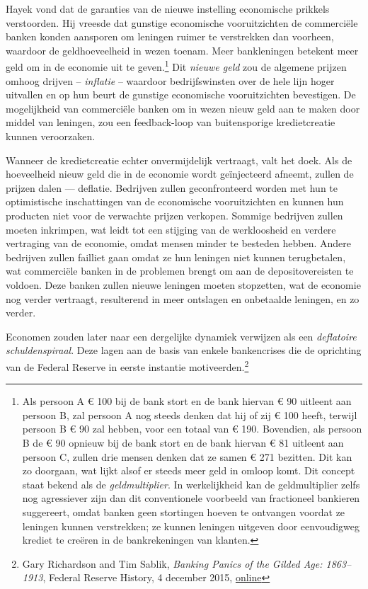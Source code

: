\documentclass[
  a5paper,
  smalldemyvopaper,11pt,twoside,onecolumn,openright,extrafontsizes,
hidelinks]{memoir}
\begin{document}
Hayek vond dat de garanties van de nieuwe instelling economische
prikkels verstoorden. Hij vreesde dat gunstige economische
vooruitzichten de commerciële banken konden aansporen om leningen ruimer
te verstrekken dan voorheen, waardoor de geldhoeveelheid in wezen
toenam. Meer bankleningen betekent meer geld om in de economie uit te
geven.\footnote{Als persoon A € 100 bij de bank stort en de bank hiervan
  € 90 uitleent aan persoon B, zal persoon A nog steeds denken dat hij
  of zij € 100 heeft, terwijl persoon B € 90 zal hebben, voor een totaal
  van € 190. Bovendien, als persoon B de € 90 opnieuw bij de bank stort
  en de bank hiervan € 81 uitleent aan persoon C, zullen drie mensen
  denken dat ze samen € 271 bezitten. Dit kan zo doorgaan, wat lijkt
  alsof er steeds meer geld in omloop komt. Dit concept staat bekend als
  de \emph{geldmultiplier}. In werkelijkheid kan de geldmultiplier zelfs
  nog agressiever zijn dan dit conventionele voorbeeld van fractioneel
  bankieren suggereert, omdat banken geen stortingen hoeven te ontvangen
  voordat ze leningen kunnen verstrekken; ze kunnen leningen uitgeven
  door eenvoudigweg krediet te creëren in de bankrekeningen van klanten.}
Dit \emph{nieuwe geld} zou de algemene prijzen omhoog drijven --
\emph{inflatie} -- waardoor bedrijfswinsten over de hele lijn hoger
uitvallen en op hun beurt de gunstige economische vooruitzichten
bevestigen. De mogelijkheid van commerciële banken om in wezen nieuw
geld aan te maken door middel van leningen, zou een feedback-loop van
buitensporige kredietcreatie kunnen veroorzaken.

Wanneer de kredietcreatie echter onvermijdelijk vertraagt, valt het
doek. Als de hoeveelheid nieuw geld die in de economie wordt
geïnjecteerd afneemt, zullen de prijzen dalen --- deflatie. Bedrijven
zullen geconfronteerd worden met hun te optimistische inschattingen van
de economische vooruitzichten en kunnen hun producten niet voor de
verwachte prijzen verkopen. Sommige bedrijven zullen moeten inkrimpen,
wat leidt tot een stijging van de werkloosheid en verdere vertraging van
de economie, omdat mensen minder te besteden hebben. Andere bedrijven
zullen failliet gaan omdat ze hun leningen niet kunnen terugbetalen, wat
commerciële banken in de problemen brengt om aan de depositovereisten te
voldoen. Deze banken zullen nieuwe leningen moeten stopzetten, wat de
economie nog verder vertraagt, resulterend in meer ontslagen en
onbetaalde leningen, en zo verder.

Economen zouden later naar een dergelijke dynamiek verwijzen als een
\emph{deflatoire schuldenspiraal}. Deze lagen aan de basis van enkele
bankencrises die de oprichting van de Federal Reserve in eerste
instantie motiveerden.\footnote{Gary Richardson and Tim Sablik,
  \emph{Banking Panics of the Gilded Age: 1863--1913}, Federal Reserve
  History, 4 december 2015,
  \href{https://www.federalreservehistory.org/essays/banking-panics-of-the-gilded-age.}{online}}
\end{document}
